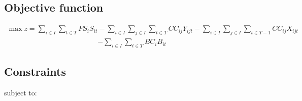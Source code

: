 \documentclass[a4paper,11pt,fleqn]{report}
\begin{document}
        \subsection{Objective function}
            \begin{align}
                \label{GPP:ObjectiveFunction} \max z = \sum_{i\in I}\sum_{t\in T} PS_iS_{it} - \sum_{i\in I} \sum_{j\in I} \sum_{t\in T} CC_{ij} Y_{ijt} - \sum_{i\in I} \sum_{j\in I} \sum_{t\in T - 1} CC_{ij} X_{ijt}
            \end{align}
            \begin{align*}
                - \sum_{i\in I}\sum_{t\in T} BC_{i} B_{it}
            \end{align*}
        \subsection{Constraints}    
        \noindent subject to:
        
\end{document}
